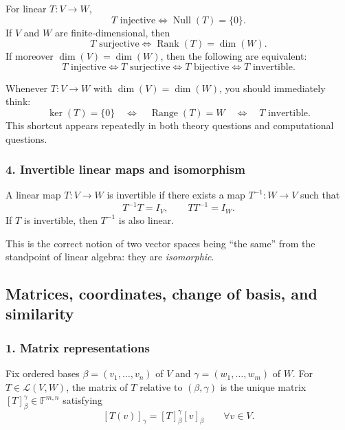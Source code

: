 \begin{keyformula}[title={Key Formula: injective, surjective, invertible}]
For linear \(T:V\to W\),
\[
T \text{ injective}
\iff
\operatorname{Null}(T)=\{0\}.
\]
If \(V\) and \(W\) are finite-dimensional, then
\[
T \text{ surjective}
\iff
\operatorname{Rank}(T)=\dim(W).
\]
If moreover \(\dim(V)=\dim(W)\), then the following are equivalent:
\[
T\text{ injective}
\iff
T\text{ surjective}
\iff
T\text{ bijective}
\iff
T\text{ invertible}.
\]
\end{keyformula}

\begin{examtip}[title={Exam Focus: the equal-dimension shortcut}]
Whenever \(T:V\to W\) with \(\dim(V)=\dim(W)\), you should immediately think:
\[
\ker(T)=\{0\}
\quad\Longleftrightarrow\quad
\operatorname{Range}(T)=W
\quad\Longleftrightarrow\quad
T\text{ invertible}.
\]
This shortcut appears repeatedly in both theory questions and computational questions.
\end{examtip}

\subsubsection*{4. Invertible linear maps and isomorphism}

A linear map \(T:V\to W\) is invertible if there exists a map \(T^{-1}:W\to V\) such that
\[
T^{-1}T=I_V,\qquad TT^{-1}=I_W.
\]
If \(T\) is invertible, then \(T^{-1}\) is also linear.

This is the correct notion of two vector spaces being ``the same'' from the standpoint of linear algebra: they are \emph{isomorphic}.

\subsection{Matrices, coordinates, change of basis, and similarity}

\subsubsection*{1. Matrix representations}

Fix ordered bases \(\beta=(v_1,\dots,v_n)\) of \(V\) and \(\gamma=(w_1,\dots,w_m)\) of \(W\). For \(T\in\mathcal{L}(V,W)\), the matrix of \(T\) relative to \((\beta,\gamma)\) is the unique matrix \([T]^\gamma_\beta\in \mathbb{F}^{m,n}\) satisfying
\[
[T(v)]_\gamma = [T]^\gamma_\beta [v]_\beta \qquad \forall v\in V.
\]

